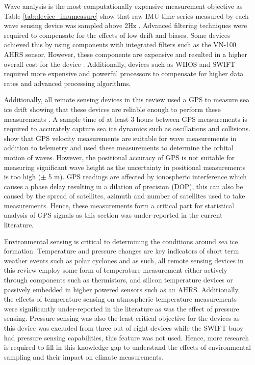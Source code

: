 Wave analysis is the most computationally expensive measurement objective as 
Table \ref{tab:device_imumeasure} show that raw IMU time series measured by each wave sensing device was sampled above 2Hz \cite{kohout2015device}. Advanced filtering techniques were required to compensate for the effects of low drift and biases. Some devices achieved this by using components with integrated filters such as the VN-100 AHRS sensor, However, these components  are expensive and resulted in a higher overall cost for the device \cite{guimaraes2018surface}. Additionally, devices such as WIIOS and SWIFT required more expensive and powerful processors to compensate for higher data rates and advanced processing algorithms. \par 

Additionally, all remote sensing devices in this review used a GPS to measure sea ice drift showing that these devices are reliable enough to perform these measurements \cite{doble2017robust}. A sample time of at least 3 hours between GPS measurements is required to accurately capture sea ice dynamics such as oscillations and collisions. \textcite{thomson2012wave} show that GPS velocity measurements are suitable for wave measurements in addition to telemetry and used these measurements to determine the orbital motion of waves. However, the positional accuracy of GPS is not suitable for measuring significant wave height as the uncertainty in positional measurements is too high ($\pm$ 5 m). GPS readings are affected by ionospheric interference which causes a phase delay resulting in a dilation of precision (DOP), this can also be caused by the spread of satellites, azimuth and number of satellites used to take measurements. Hence, these measurements form a critical part for statistical analysis of GPS signals as this section was under-reported in the current literature. \par 

Environmental sensing is critical to determining the conditions around sea ice formation. Temperature and pressure changes are key indicators of short term weather events such as polar cyclones and as such, all remote sensing devices in this review employ some form of temperature measurement either actively through components such as thermistors, and silicon temperature devices or passively embedded in higher powered sensors such as an AHRS. Additionally, the effects of temperature sensing on atmospheric temperature measurements were significantly under-reported in the literature as was the effect of pressure sensing.  Pressure sensing was also the least critical objective for the devices as this device was excluded from three out of eight devices while the SWIFT buoy had pressure sensing capabilities, this feature was not used. Hence, more research is required to fill in this knowledge gap to understand the effects of environmental sampling and their impact on climate measurements. \par

